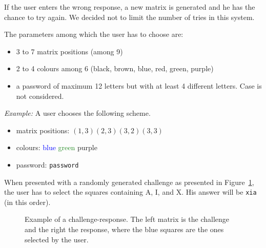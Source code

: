 \documentclass[11pt,a4paper]{article}
\begin{document}
If the user enters the wrong response, a new matrix is generated and he has the chance to try again. We decided not to limit the number of tries in this system.

The parameters among which the user has to choose are:
\begin{itemize}
\item 3 to 7 matrix positions (among 9)
\item 2 to 4 colours among 6 (black, brown, blue, red, green, purple)
\item a password of maximum 12 letters but with at least 4 different letters. Case is not considered.
\end{itemize}

\textit{Example:} A user chooses the following scheme.
\begin{itemize}
\item matrix positions: $(1,3) (2,3) (3,2) (3,3)$
\item colours: \textcolor{blue}{blue} \textcolor{ForestGreen}{green} \textcolor{RoyalPurple}{purple}
\item password: \texttt{password}
\end{itemize}
When presented with a randomly generated challenge as presented in Figure~\ref{fig:ex1}, the user has to select the squares containing A, I, and X. His answer will be \texttt{xia} (in this order).
\begin{figure}[!ht]
\centering
{}
\caption{Example of a challenge-response. The left matrix is the challenge and the right the response, where the blue squares are the ones selected by the user.}
\label{fig:ex1}
\end{figure}
\end{document}
